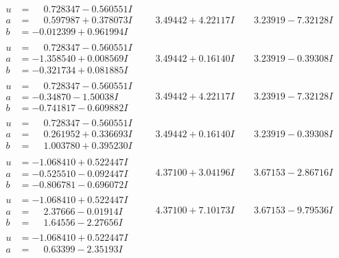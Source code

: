 \documentclass[1p]{elsarticle_modified}
\theoremstyle{definition}
\begin{document}
$$\begin{array}{c|c|c}
\begin{aligned}
u &= \phantom{-}0.728347 - 0.560551 I \\
a &= \phantom{-}0.597987 + 0.378073 I \\
b &= -0.012399 + 0.961994 I\end{aligned}
 & \phantom{-}3.49442 + 4.22117 I & \phantom{-}3.23919 - 7.32128 I \\ \hline\begin{aligned}
u &= \phantom{-}0.728347 - 0.560551 I \\
a &= -1.358540 + 0.008569 I \\
b &= -0.321734 + 0.081885 I\end{aligned}
 & \phantom{-}3.49442 + 0.16140 I & \phantom{-}3.23919 - 0.39308 I \\ \hline\begin{aligned}
u &= \phantom{-}0.728347 - 0.560551 I \\
a &= -0.34870 - 1.50038 I \\
b &= -0.741817 - 0.609882 I\end{aligned}
 & \phantom{-}3.49442 + 4.22117 I & \phantom{-}3.23919 - 7.32128 I \\ \hline\begin{aligned}
u &= \phantom{-}0.728347 - 0.560551 I \\
a &= \phantom{-}0.261952 + 0.336693 I \\
b &= \phantom{-}1.003780 + 0.395230 I\end{aligned}
 & \phantom{-}3.49442 + 0.16140 I & \phantom{-}3.23919 - 0.39308 I \\ \hline\begin{aligned}
u &= -1.068410 + 0.522447 I \\
a &= -0.525510 - 0.092447 I \\
b &= -0.806781 - 0.696072 I\end{aligned}
 & \phantom{-}4.37100 + 3.04196 I & \phantom{-}3.67153 - 2.86716 I \\ \hline\begin{aligned}
u &= -1.068410 + 0.522447 I \\
a &= \phantom{-}2.37666 - 0.01914 I \\
b &= \phantom{-}1.64556 - 2.27656 I\end{aligned}
 & \phantom{-}4.37100 + 7.10173 I & \phantom{-}3.67153 - 9.79536 I \\ \hline\begin{aligned}
u &= -1.068410 + 0.522447 I \\
a &= \phantom{-}0.63399 - 2.35193 I \\

\end{aligned}
\end{array}$$
\end{document}
